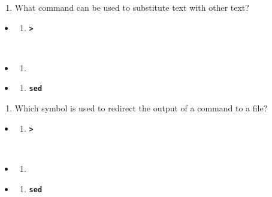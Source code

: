 \documentclass[
  letterpaper,
  DIV=11,
  numbers=noendperiod]{scrreprt}
\providecommand{\tightlist}{%
  \setlength{\itemsep}{0pt}\setlength{\parskip}{0pt}}
\begin{document}
\begin{enumerate}
\def\labelenumi{\arabic{enumi}.}
\setcounter{enumi}{1}
\tightlist
\item
  What command can be used to substitute text with other text?
\end{enumerate}

\begin{itemize}
\tightlist
\item
  \begin{enumerate}
  \def\labelenumi{(\Alph{enumi})}
  \tightlist
  \item
    \textbf{\texttt{\textgreater{}}}\strut \\
  \end{enumerate}
\item
  \begin{enumerate}
  \def\labelenumi{(\Alph{enumi})}
  \setcounter{enumi}{1}
  \tightlist
  \item
    \textbf{\texttt{\textbar{}}}\strut \\
  \end{enumerate}
\item
  \begin{enumerate}
  \def\labelenumi{(\Alph{enumi})}
  \setcounter{enumi}{2}
  \tightlist
  \item
    \textbf{\texttt{sed}}
  \end{enumerate}
\end{itemize}

\begin{enumerate}
\def\labelenumi{\arabic{enumi}.}
\setcounter{enumi}{2}
\tightlist
\item
  Which symbol is used to redirect the output of a command to a file?
\end{enumerate}

\begin{itemize}
\tightlist
\item
  \begin{enumerate}
  \def\labelenumi{(\Alph{enumi})}
  \tightlist
  \item
    \textbf{\texttt{\textgreater{}}}\strut \\
  \end{enumerate}
\item
  \begin{enumerate}
  \def\labelenumi{(\Alph{enumi})}
  \setcounter{enumi}{1}
  \tightlist
  \item
    \textbf{\texttt{\textbar{}}}\strut \\
  \end{enumerate}
\item
  \begin{enumerate}
  \def\labelenumi{(\Alph{enumi})}
  \setcounter{enumi}{2}
  \tightlist
  \item
    \textbf{\texttt{sed}}
  \end{enumerate}
\end{itemize}
\end{document}
